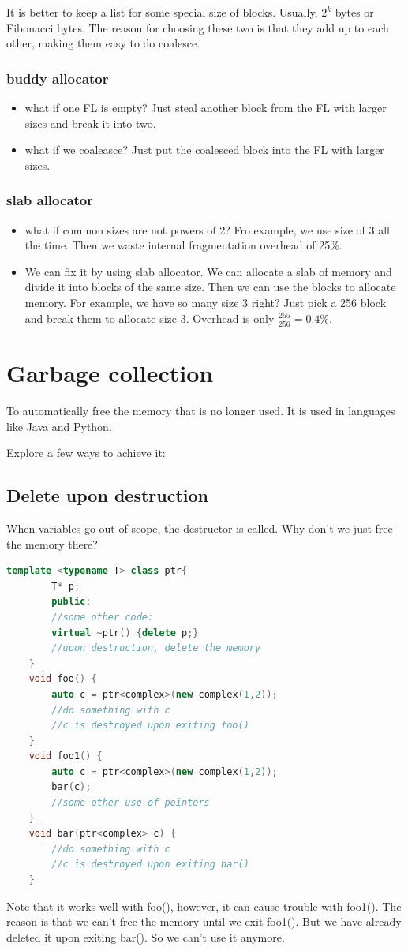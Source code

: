 \documentclass[letterpaper,12pt]{article}
\begin{document}
It is better to keep a list for some special size of blocks. Usually, $2^k$
bytes or Fibonacci bytes. The reason for choosing these two is that they add up
to each other, making them easy to do coalesce.

\subsubsection{buddy allocator}
\begin{itemize}
    \item what if one FL is empty? Just steal another block from the FL with larger sizes
          and break it into two.
    \item what if we coaleasce? Just put the coalesced block into the FL with larger
          sizes.
\end{itemize}
\subsubsection{slab allocator}
\begin{itemize}
    \item what if common sizes are not powers of 2? Fro example, we use size of 3 all the
          time. Then we waste internal fragmentation overhead of 25\%.
    \item We can fix it by using slab allocator. We can allocate a slab of memory and
          divide it into blocks of the same size. Then we can use the blocks to allocate
          memory. For example, we have so many size 3 right? Just pick a 256 block and
          break them to allocate size 3. Overhead is only $\frac{255}{256}=0.4$\%.
\end{itemize}
\section{Garbage collection}
To automatically free the memory that is no longer used. It is used in
languages like Java and Python.

Explore a few ways to achieve it:
\subsection{Delete upon destruction}
When variables go out of scope, the destructor is called. Why don't we just
free the memory there?
\begin{lstlisting}[language=C++]
    template <typename T> class ptr{
        T* p;
        public:
        //some other code:
        virtual ~ptr() {delete p;}
        //upon destruction, delete the memory
    }
    void foo() {
        auto c = ptr<complex>(new complex(1,2));
        //do something with c
        //c is destroyed upon exiting foo()
    }
    void foo1() {
        auto c = ptr<complex>(new complex(1,2));
        bar(c);
        //some other use of pointers
    }
    void bar(ptr<complex> c) {
        //do something with c
        //c is destroyed upon exiting bar()
    }
\end{lstlisting}
Note that it works well with foo(), however, it can cause trouble with foo1().
The reason is that we can't free the memory until we exit foo1(). But we have
already deleted it upon exiting bar(). So we can't use it anymore.
\end{document}
